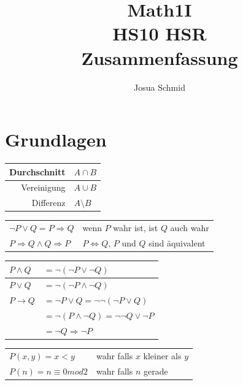 \documentclass[a4paper]{article}
\title{Math1I\\HS10 HSR\\Zusammenfassung}
\author{Josua Schmid}
\begin{document}
\tableofcontents
\newpage

\section{Grundlagen}
	\begin{multicols}{2}
	
	\begin{fmerke}
		\renewcommand{\arraystretch}{1.3}
		\begin{tabular}{r|l}
			Durchschnitt & $A \cap B$ \\\hline
			Vereinigung  & $A \cup B$ \\\hline
			Differenz    & $A \setminus B$
		\end{tabular}
	\end{fmerke}
	
	\begin{fmerke}[Verknüpfung]
	\begin{tabular}{ll}
		$\lnot P \vee Q = P \Rightarrow Q$ & wenn $P$ wahr ist, ist $Q$ auch wahr \\
		$P \Rightarrow Q \wedge Q \Rightarrow P$ & $P \Leftrightarrow Q$, $P$ und $Q$ sind äquivalent
	\end{tabular}
	\end{fmerke}
	
	\begin{fmerke}
	\begin{tabular}{ll}
		$P \wedge Q$ & $= \lnot(\lnot P \vee \lnot Q)$ \\ \hline
		$P \vee Q$ & $=  \lnot(\lnot P \wedge \lnot Q)$ \\ \hline
		$P \rightarrow Q$ & $= \lnot P \vee Q = \lnot\lnot(\lnot P \vee Q)$ \\
		& $= \lnot(P \wedge \lnot Q) = \lnot\lnot Q \vee \lnot P$ \\
		& $= \lnot Q \Rightarrow \lnot P$
	\end{tabular}
	\end{fmerke}
	
	\begin{fmerke}[Prädikate]
	\begin{tabular}{ll}
		$P(x, y) = x < y$ & wahr falls $x$ kleiner als $y$ \\
		$P(n) = n \equiv 0 mod 2$ & wahr falls $n$ gerade
	\end{tabular}
	\end{fmerke}	
	

\end{multicols}
\end{document}
